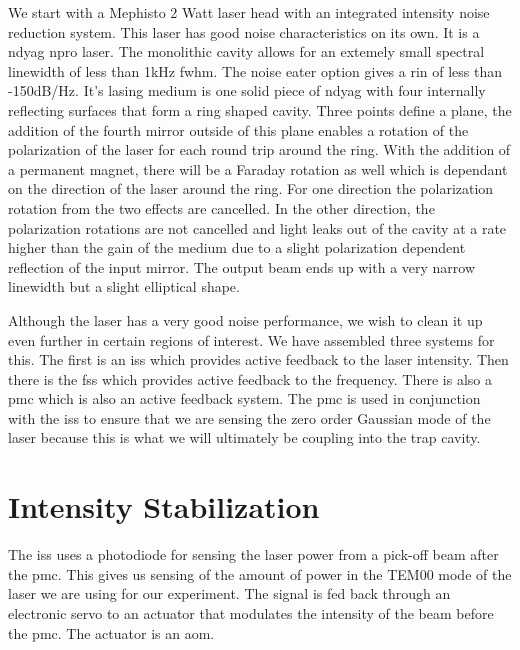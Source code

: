 We start with a Mephisto 2 Watt laser head with an integrated intensity
noise reduction system.
This laser has good noise characteristics on its own.
It is a \ac{ndyag} \ac{npro} laser. The monolithic cavity allows for an
extemely small spectral linewidth of less than 1kHz \ac{fwhm}. The noise
eater option gives a \ac{rin} of less than -150dB/Hz.
It's lasing medium is one solid piece of \ac{ndyag} with four internally reflecting
surfaces that form a ring shaped cavity. Three points define a plane, the
addition of the fourth mirror outside of this plane enables a rotation of
the polarization of the laser for each round trip around the ring. With the addition
of a permanent magnet, there will be a Faraday rotation as well which is
dependant on the direction of the laser around the ring. For one direction
the polarization rotation from the two effects are cancelled. In the other
direction, the polarization rotations are not cancelled and light leaks out
of the cavity at a rate higher than the gain of the medium due to a slight
polarization dependent reflection of the input mirror. The output beam ends
up with a very narrow linewidth but a slight elliptical shape.

Although the laser has a very good noise performance, we wish to clean it up
even further in certain regions of interest. We have assembled three systems
for this. The first is an \ac{iss} which provides active feedback to the laser
intensity. Then there is the \ac{fss} which provides active feedback to the
frequency. There is also a \ac{pmc} which is also an active feedback system. The
\ac{pmc} is used in conjunction with the \ac{iss} to ensure that we are
sensing the zero order Gaussian mode of the laser because this is what
we will ultimately be coupling into the trap cavity.

\section{Intensity Stabilization}


The \ac{iss} uses a photodiode for sensing the laser power from a pick-off
beam after the \ac{pmc}. This gives us sensing of the amount of power in
the TEM00 mode of the laser we are using for our experiment. The signal is
fed back through an electronic servo to an actuator that modulates the
intensity of the beam before the \ac{pmc}. The actuator is an \ac{aom}.


